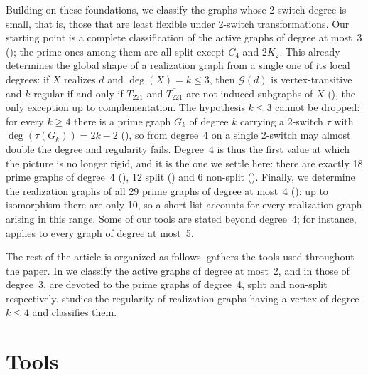 \documentclass[11pt]{article}
\begin{document}
Building on these foundations, we classify the graphs whose
2-switch-degree is small, that is, those that are least flexible under
2-switch transformations. Our starting point is a complete classification
of the active graphs of degree at most~3
(); the prime
ones among them are all split except $C_4$ and $2K_2$. This already
determines the global shape of a realization graph from a single one of
its local degrees: if $X$ realizes $d$ and $\deg(X)=k\le3$, then
$\mathcal{G}(d)$ is vertex-transitive and $k$-regular if and only if
$T_{221}$ and $\overline{T_{221}}$ are not induced subgraphs of $X$
(), the only exception up to complementation. The
hypothesis $k\le3$ cannot be dropped: for every $k\ge 4$ there is a prime
graph $G_k$ of degree $k$ carrying a 2-switch $\tau$ with
$\deg(\tau(G_k))=2k-2$ (), so from degree~4 on a single
2-switch may almost double the degree and regularity fails. Degree~4 is
thus the first value at which the picture is no longer rigid, and it is
the one we settle here: there are exactly 18 prime graphs of degree~4
(), 12 split
() and 6 non-split
(). Finally, we determine the
realization graphs of all 29 prime graphs of degree at most~4
(): up to isomorphism there are only 10, so
a short list accounts for every realization graph arising in this range.
Some of our tools are stated beyond degree~4; for instance,
 applies to every graph of degree at most~5.

The rest of the article is organized as follows. 
gathers the tools used throughout the paper. In  we
classify the active graphs of degree at most~2, and in 
those of degree~3.  are devoted to the
prime graphs of degree~4, split and non-split respectively.  studies the regularity of
realization graphs having a vertex of degree $k\le4$ and classifies them.



\section{Tools}\label{sec_tools}	
\end{document}
